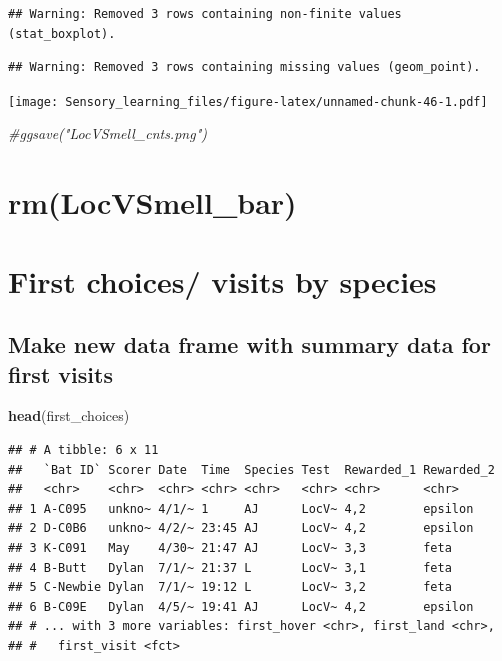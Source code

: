 \documentclass[]{article}
\newenvironment{Shaded}{\begin{snugshade}}{\end{snugshade}}
\newcommand{\KeywordTok}[1]{\textcolor[rgb]{0.13,0.29,0.53}{\textbf{{#1}}}}
\newcommand{\CommentTok}[1]{\textcolor[rgb]{0.56,0.35,0.01}{\textit{{#1}}}}
\newcommand{\NormalTok}[1]{{#1}}
\begin{document}
\begin{verbatim}
## Warning: Removed 3 rows containing non-finite values (stat_boxplot).
\end{verbatim}

\begin{verbatim}
## Warning: Removed 3 rows containing missing values (geom_point).
\end{verbatim}

\texttt{[image: Sensory\_learning\_files/figure-latex/unnamed-chunk-46-1.pdf]}

\begin{Shaded}
\begin{Highlighting}[]
\CommentTok{#ggsave("LocVSmell_cnts.png")}
\end{Highlighting}
\end{Shaded}

\section{rm(LocVSmell\_bar)}\label{rmlocvsmell_bar}

\section{First choices/ visits by
species}\label{first-choices-visits-by-species-1}

\subsection{Make new data frame with summary data for first
visits}\label{make-new-data-frame-with-summary-data-for-first-visits-1}

\begin{Shaded}
\begin{Highlighting}[]
\KeywordTok{head}\NormalTok{(first_choices)}
\end{Highlighting}
\end{Shaded}

\begin{verbatim}
## # A tibble: 6 x 11
##   `Bat ID` Scorer Date  Time  Species Test  Rewarded_1 Rewarded_2
##   <chr>    <chr>  <chr> <chr> <chr>   <chr> <chr>      <chr>     
## 1 A-C095   unkno~ 4/1/~ 1     AJ      LocV~ 4,2        epsilon   
## 2 D-C0B6   unkno~ 4/2/~ 23:45 AJ      LocV~ 4,2        epsilon   
## 3 K-C091   May    4/30~ 21:47 AJ      LocV~ 3,3        feta      
## 4 B-Butt   Dylan  7/1/~ 21:37 L       LocV~ 3,1        feta      
## 5 C-Newbie Dylan  7/1/~ 19:12 L       LocV~ 3,2        feta      
## 6 B-C09E   Dylan  4/5/~ 19:41 AJ      LocV~ 4,2        epsilon   
## # ... with 3 more variables: first_hover <chr>, first_land <chr>,
## #   first_visit <fct>
\end{verbatim}
\end{document}
